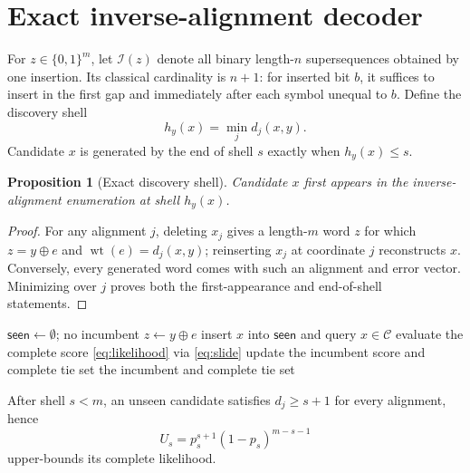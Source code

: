 \documentclass[conference]{IEEEtran}
\newtheorem{proposition}[theorem]{Proposition}
\newcommand{\C}{\mathcal C}
\newcommand{\wt}{\operatorname{wt}}
\begin{document}
\section{Exact inverse-alignment decoder}
For $z\in\{0,1\}^{m}$, let $\mathcal I(z)$ denote all binary length-$n$ supersequences obtained by
one insertion. Its classical cardinality is $n+1$: for inserted bit $b$, it suffices to insert in
the first gap and immediately after each symbol unequal to $b$. Define the discovery shell
\[
 h_y(x)=\min_j d_j(x,y).
\]
Candidate $x$ is generated by the end of shell $s$ exactly when $h_y(x)\le s$.

\begin{proposition}[Exact discovery shell]\label{prop:shell}
Candidate $x$ first appears in the inverse-alignment enumeration at shell $h_y(x)$.
\end{proposition}
\begin{proof}
For any alignment $j$, deleting $x_j$ gives a length-$m$ word $z$ for which
$z=y\oplus e$ and $\wt(e)=d_j(x,y)$; reinserting $x_j$ at coordinate $j$ reconstructs $x$.
Conversely, every generated word comes with such an alignment and error vector. Minimizing over
$j$ proves both the first-appearance and end-of-shell statements.
\end{proof}

\begin{algorithm}[t]
\caption{Baseline one-deletion FIBER-GRAND}\label{alg:fiber}
\begin{algorithmic}[1]
\State $\mathsf{seen}\gets\emptyset$; no incumbent
  \ForAll{$e\in\{0,1\}^m$ with $\wt(e)=s$}
    \State $z\gets y\oplus e$
        \State insert $x$ into $\mathsf{seen}$ and query $x\in\C$
        \If{$x\in\C$}
          \State evaluate the complete score \eqref{eq:likelihood} via \eqref{eq:slide}
          \State update the incumbent score and complete tie set
        \EndIf
      \EndIf
    \EndFor
  \EndFor
    \State \Return the incumbent and complete tie set
  \EndIf
\EndFor
\end{algorithmic}
\end{algorithm}

After shell $s<m$, an unseen candidate satisfies $d_j\ge s+1$ for every alignment, hence
\begin{equation}
 U_s=p_s^{s+1}(1-p_s)^{m-s-1} \label{eq:unseen}
\end{equation}
upper-bounds its complete likelihood.
\end{document}
